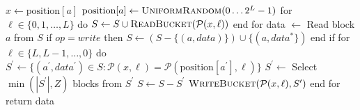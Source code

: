 $x \gets \text{position}[a]$
$\text{position}[a] \gets \textsc{UniformRandom} (0 \ldots 2^L - 1)$
for $\ell \in \{ 0, 1, \ldots , L \}$ do
    $S \gets S \cup \textsc{ReadBucket}(\mathcal{P}(x, \ell))$
end for
data $\gets$ Read block $a$ from $S$
if $op = write$ then
    $S \gets (S - \{ (a, data) \} ) \cup \{ (a, data^{\mbox{*}} \} )$
end if
for $\ell \in \{ L, L-1, \ldots , 0 \}$ do
    $S^\prime \gets \{ (a^\prime, data^\prime) \in S : \mathcal{P}(x, \ell) = \mathcal{P}( \text{position}[a^\prime], \ell) \}$
    $S^\prime \gets$ Select $\min ( | S^\prime |, Z)$ blocks from $S^\prime$
    $S \gets S - S^\prime$
    $\textsc{WriteBucket} (\mathcal{P} (x, \ell), S^\prime)$
end for
return data
